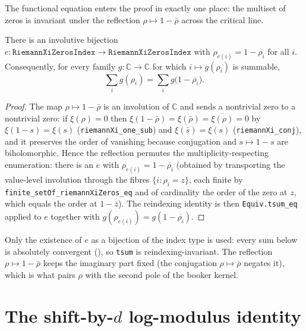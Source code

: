 The functional equation enters the proof in exactly one place: the multiset of zeros
is invariant under the reflection $\rho\mapsto1-\bar\rho$ across the critical line.

\begin{lemma}
\label{lem:ll_reflection}
\leanok
{}
There is an involutive bijection $e:\texttt{RiemannXiZerosIndex}\to
\texttt{RiemannXiZerosIndex}$ with $\rho_{e(i)}=1-\overline{\rho_i}$ for all $i$.
Consequently, for every family $g:\mathbb C\to\mathbb C$ for which
$i\mapsto g(\rho_i)$ is summable,
\[
  \sum_i g(\rho_i)=\sum_i g\bigl(1-\overline{\rho_i}\bigr).
\]
\end{lemma}

\begin{proof}
\leanok
{}
The map $\rho\mapsto1-\bar\rho$ is an involution of $\mathbb C$ and sends a nontrivial
zero to a nontrivial zero: if $\xi(\rho)=0$ then
$\xi(1-\bar\rho)=\xi(\bar\rho)=\overline{\xi(\rho)}=0$ by
$\xi(1-s)=\xi(s)$ (\texttt{riemannXi\_one\_sub}) and
$\overline{\xi(\bar s)}=\xi(s)$ (\texttt{riemannXi\_conj}), and it preserves the
order of vanishing because conjugation and $s\mapsto1-s$ are biholomorphic. Hence the
reflection permutes the multiplicity-respecting enumeration: there is an $e$ with
$\rho_{e(i)}=1-\overline{\rho_i}$ (obtained by transporting the value-level involution
through the fibres $\{i:\rho_i=z\}$, each finite by
\texttt{finite\_setOf\_riemannXiZeros\_eq} and of cardinality the order of the zero at
$z$, which equals the order at $1-\bar z$). The reindexing identity is then
\texttt{Equiv.tsum\_eq} applied to $e$ together with $g(\rho_{e(i)})=g(1-\overline{\rho_i})$.
\end{proof}

\begin{remark}
Only the existence of $e$ as a bijection of the index type is used: every sum below is
absolutely convergent (), so \texttt{tsum} is
reindexing-invariant. The reflection $\rho\mapsto1-\bar\rho$ keeps the imaginary part
fixed (the conjugation $\rho\mapsto\bar\rho$ negates it), which is what pairs $\rho$ with
the second pole of the booker kernel.
\end{remark}

\section{The shift-by-\texorpdfstring{$d$}{d} log-modulus identity}
\label{sec:ll_shift}

